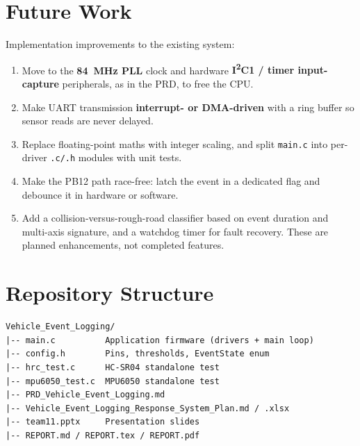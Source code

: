 \documentclass[11pt,a4paper]{article}
\begin{document}
\section{Future Work}
Implementation improvements to the existing system:
\begin{enumerate}
  \item Move to the \textbf{84~MHz PLL} clock and hardware \textbf{I\textsuperscript{2}C1 / timer input-capture} peripherals, as in the PRD, to free the CPU.
  \item Make UART transmission \textbf{interrupt- or DMA-driven} with a ring buffer so sensor reads are never delayed.
  \item Replace floating-point maths with integer scaling, and split \texttt{main.c} into per-driver \texttt{.c/.h} modules with unit tests.
  \item Make the PB12 path race-free: latch the event in a dedicated flag and debounce it in hardware or software.
  \item Add a collision-versus-rough-road classifier based on event duration and multi-axis signature, and a watchdog timer for fault recovery. These are planned enhancements, not completed features.
\end{enumerate}

\section{Repository Structure}
\begin{lstlisting}
Vehicle_Event_Logging/
|-- main.c          Application firmware (drivers + main loop)
|-- config.h        Pins, thresholds, EventState enum
|-- hrc_test.c      HC-SR04 standalone test
|-- mpu6050_test.c  MPU6050 standalone test
|-- PRD_Vehicle_Event_Logging.md
|-- Vehicle_Event_Logging_Response_System_Plan.md / .xlsx
|-- team11.pptx     Presentation slides
|-- REPORT.md / REPORT.tex / REPORT.pdf
\end{lstlisting}

\end{document}
